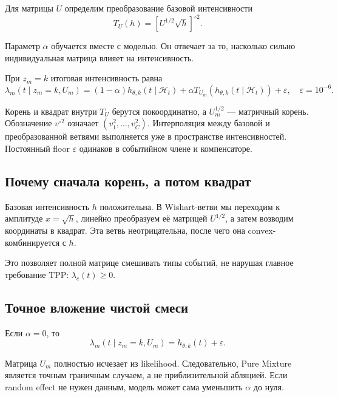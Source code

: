 \documentclass[12pt,a4paper]{article}
\newcommand{\History}{\mathcal{H}}
\begin{document}
Для матрицы \(U\) определим преобразование базовой интенсивности
\begin{equation}
T_U(h)=\left[U^{1/2}\sqrt h\right]^{\circ2}.
\label{eq:operator}
\end{equation}

Параметр \(\alpha\) обучается вместе с моделью. Он отвечает за то, насколько сильно индивидуальная матрица влияет на интенсивность.

При \(z_m=k\) итоговая интенсивность равна
\begin{equation}
\boxed{\lambda_m(t\mid z_m=k,U_m)=(1-\alpha)h_{\theta,k}(t\mid\History_t)+\alpha T_{U_m}\!\left(h_{\theta,k}(t\mid\History_t)\right)+\varepsilon,\quad\varepsilon=10^{-6}.}
\label{eq:active-rate}
\end{equation}

Корень и квадрат внутри \(T_U\) берутся покоординатно, а \(U_m^{1/2}\) --- матричный корень. Обозначение \(v^{\circ2}\) означает \((v_1^2,\ldots,v_C^2)\). Интерполяция между базовой и преобразованной ветвями выполняется уже в пространстве интенсивностей. Постоянный floor \(\varepsilon\) одинаков в событийном члене и компенсаторе.

\subsection{Почему сначала корень, а потом квадрат}

Базовая интенсивность \(h\) положительна. В Wishart-ветви мы переходим к амплитуде \(x=\sqrt h\), линейно преобразуем её матрицей \(U^{1/2}\), а затем возводим координаты в квадрат. Эта ветвь неотрицательна, после чего она convex-комбинируется с \(h\).

Это позволяет полной матрице смешивать типы событий, не нарушая главное требование TPP: \(\lambda_c(t)\geq0\).

\subsection{Точное вложение чистой смеси}

Если \(\alpha=0\), то
\begin{equation}
\lambda_m(t\mid z_m=k,U_m)=h_{\theta,k}(t)+\varepsilon.
\end{equation}

Матрица \(U_m\) полностью исчезает из likelihood. Следовательно, Pure Mixture является точным граничным случаем, а не приблизительной абляцией. Если random effect не нужен данным, модель может сама уменьшить \(\alpha\) до нуля.
\end{document}
